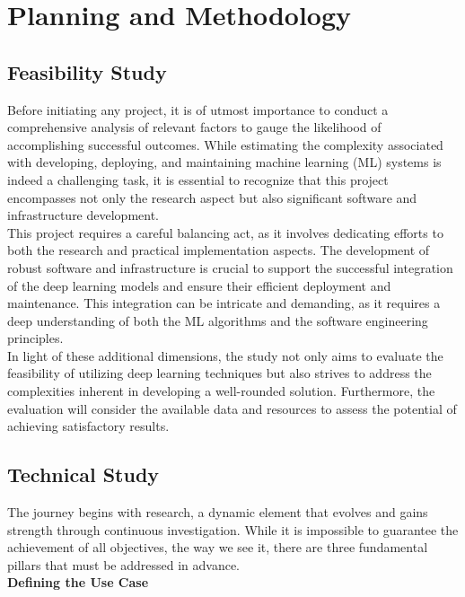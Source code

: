 \chapter{Planning and Methodology}
\label{cap:plan}

\section{Feasibility Study}

Before initiating any project, it is of utmost importance to conduct a comprehensive analysis of relevant factors to gauge the likelihood of accomplishing successful outcomes. While estimating the complexity associated with developing, deploying, and maintaining machine learning (ML) systems is indeed a challenging task, it is essential to recognize that this project encompasses not only the research aspect but also significant software and infrastructure development. \\

This project requires a careful balancing act, as it involves dedicating efforts to both the research and practical implementation aspects. The development of robust software and infrastructure is crucial to support the successful integration of the deep learning models and ensure their efficient deployment and maintenance. This integration can be intricate and demanding, as it requires a deep understanding of both the ML algorithms and the software engineering principles. \\

In light of these additional dimensions, the study not only aims to evaluate the feasibility of utilizing deep learning techniques but also strives to address the complexities inherent in developing a well-rounded solution. Furthermore, the evaluation will consider the available data and resources to assess the potential of achieving satisfactory results.

\section{Technical Study}

The journey begins with research,
a dynamic element that evolves and gains strength through continuous investigation.
While it is impossible to guarantee the achievement of all objectives, the way we see it,
there are three fundamental pillars that must be addressed in advance. \\

\vspace{0.5cm}
\textbf{Defining the Use Case} \\

